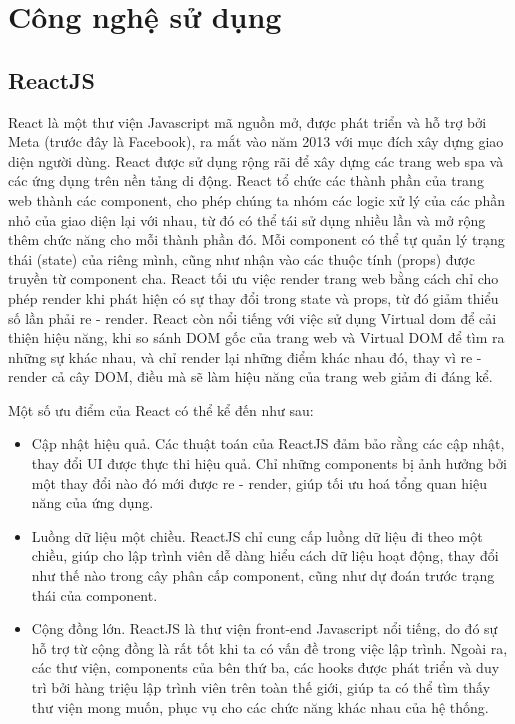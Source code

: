 \section{Công nghệ sử dụng}
\subsection{ReactJS}
React là một thư viện Javascript mã nguồn mở, được phát triển và hỗ trợ bởi
Meta (trước đây là Facebook), ra mắt vào năm 2013 với mục đích xây dựng giao
diện người dùng. React được sử dụng rộng rãi để xây dựng các trang web \acrfull*{spa} và các ứng dụng trên nền tảng di động. React tổ chức
các thành phần của trang web thành các component, cho phép chúng ta nhóm các
logic xử lý của các phần nhỏ của giao diện lại với nhau, từ đó có thể tái sử
dụng nhiều lần và mở rộng thêm chức năng cho mỗi thành phần đó. Mỗi component
có thể tự quản lý trạng thái (state) của riêng mình, cũng như nhận vào các
thuộc tính (props) được truyền từ component cha. React tối ưu việc render trang
web bằng cách chỉ cho phép render khi phát hiện có sự thay đổi trong state và
props, từ đó giảm thiểu số lần phải re - render. React còn nổi tiếng với việc
sử dụng Virtual \acrshort*{dom} để cải thiện hiệu năng, khi so sánh DOM gốc của trang web
và Virtual DOM để tìm ra những sự khác nhau, và chỉ render lại những điểm khác
nhau đó, thay vì re - render cả cây DOM, điều mà sẽ làm hiệu năng của trang web
giảm đi đáng kể.
\par
Một số ưu điểm của React có thể kể đến như sau:
\begin{itemize}
    \item Cập nhật hiệu quả. Các thuật toán của ReactJS đảm bảo rằng các cập nhật, thay
          đổi UI được thực thi hiệu quả. Chỉ những components bị ảnh hưởng bởi một thay
          đổi nào đó mới được re - render, giúp tối ưu hoá tổng quan hiệu năng của ứng
          dụng.
    \item Luồng dữ liệu một chiều. ReactJS chỉ cung cấp luồng dữ liệu đi theo một chiều,
          giúp cho lập trình viên dễ dàng hiểu cách dữ liệu hoạt động, thay đổi như thế
          nào trong cây phân cấp component, cũng như dự đoán trước trạng thái của
          component.
    \item Cộng đồng lớn. ReactJS là thư viện front-end Javascript nổi tiếng, do đó sự hỗ
          trợ từ cộng đồng là rất tốt khi ta có vấn đề trong việc lập trình. Ngoài ra,
          các thư viện, components của bên thứ ba, các hooks được phát triển và duy trì
          bởi hàng triệu lập trình viên trên toàn thế giới, giúp ta có thể tìm thấy thư
          viện mong muốn, phục vụ cho các chức năng khác nhau của hệ thống.
\end{itemize}
